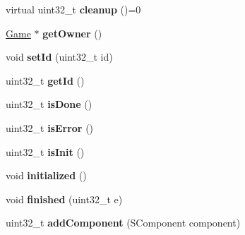 \begin{DoxyCompactItemize}
\item 
\hypertarget{classbali_1_1_game_stage_ac4b782c70fd421fcc12d4bfd5c60cb9e}{virtual uint32\-\_\-t {\bfseries cleanup} ()=0}\label{classbali_1_1_game_stage_ac4b782c70fd421fcc12d4bfd5c60cb9e}

\item 
\hypertarget{classbali_1_1_game_stage_a2aa1273fdac8c829e2f714ec105c8e69}{\hyperlink{classbali_1_1_game}{Game} $\ast$ {\bfseries get\-Owner} ()}\label{classbali_1_1_game_stage_a2aa1273fdac8c829e2f714ec105c8e69}

\item 
\hypertarget{classbali_1_1_game_stage_af387e0899bf3d472d64dc9b2e4d934cd}{void {\bfseries set\-Id} (uint32\-\_\-t id)}\label{classbali_1_1_game_stage_af387e0899bf3d472d64dc9b2e4d934cd}

\item 
\hypertarget{classbali_1_1_game_stage_ac24c6bb7e3c2bbfffba5eb54df82095c}{uint32\-\_\-t {\bfseries get\-Id} ()}\label{classbali_1_1_game_stage_ac24c6bb7e3c2bbfffba5eb54df82095c}

\item 
\hypertarget{classbali_1_1_game_stage_acd54d56be576f606fe4509bdf934e982}{uint32\-\_\-t {\bfseries is\-Done} ()}\label{classbali_1_1_game_stage_acd54d56be576f606fe4509bdf934e982}

\item 
\hypertarget{classbali_1_1_game_stage_afe0f91e3b39a031dd78cab6d7c4b2a09}{uint32\-\_\-t {\bfseries is\-Error} ()}\label{classbali_1_1_game_stage_afe0f91e3b39a031dd78cab6d7c4b2a09}

\item 
\hypertarget{classbali_1_1_game_stage_a81bcc4202a13b1d30db605455b871f1f}{uint32\-\_\-t {\bfseries is\-Init} ()}\label{classbali_1_1_game_stage_a81bcc4202a13b1d30db605455b871f1f}

\item 
\hypertarget{classbali_1_1_game_stage_aec684b7762e34c93ff8b03431fd983b2}{void {\bfseries initialized} ()}\label{classbali_1_1_game_stage_aec684b7762e34c93ff8b03431fd983b2}

\item 
\hypertarget{classbali_1_1_game_stage_a638c16f4d96e8d6a2af138d1e6050524}{void {\bfseries finished} (uint32\-\_\-t e)}\label{classbali_1_1_game_stage_a638c16f4d96e8d6a2af138d1e6050524}

\item 
\hypertarget{classbali_1_1_game_stage_ae07bafe55e36f2a94c6a73fe67c72948}{uint32\-\_\-t {\bfseries add\-Component} (S\-Component component)}\label{classbali_1_1_game_stage_ae07bafe55e36f2a94c6a73fe67c72948}

\end{DoxyCompactItemize}
